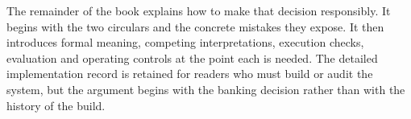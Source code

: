 \documentclass[12pt,a4paper,oneside,openany]{book}
\begin{document}
The remainder of the book explains how to make that decision responsibly. It
begins with the two circulars and the concrete mistakes they expose. It then
introduces formal meaning, competing interpretations, execution checks,
evaluation and operating controls at the point each is needed. The detailed
implementation record is retained for readers who must build or audit the
system, but the argument begins with the banking decision rather than with the
history of the build.
\tableofcontents
\mainmatter










\appendix



\backmatter
\begingroup
\raggedright


\endgroup
\end{document}
